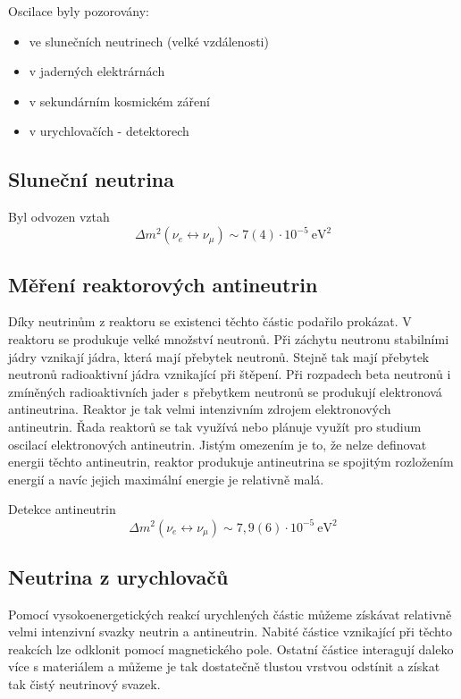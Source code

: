 \documentclass[../../main.tex]{subfiles}
\begin{document}
Oscilace byly pozorovány:
\begin{itemize}
	\item ve slunečních neutrinech (velké vzdálenosti)
	\item v jaderných elektrárnách
	\item v sekundárním kosmickém záření
	\item v urychlovačích - detektorech
\end{itemize}	
	
\subsection{Sluneční neutrina}

Byl odvozen vztah 
\begin{equation}
\Delta m^2 (\nu_e \leftrightarrow \nu_{\mu}) \sim 7(4) \cdotp 10^{-5} ~\mathrm{eV^2}
\end{equation}

\subsection{Měření reaktorových antineutrin}

Díky neutrinům z reaktoru se existenci těchto částic podařilo prokázat. V reaktoru se produkuje velké množství neutronů. Při záchytu neutronu stabilními jádry vznikají jádra, která mají přebytek neutronů. Stejně tak mají přebytek neutronů radioaktivní jádra vznikající při štěpení. Při rozpadech beta neutronů i zmíněných radioaktivních jader s přebytkem neutronů se produkují elektronová antineutrina. Reaktor je tak velmi intenzivním zdrojem elektronových antineutrin. Řada reaktorů se tak využívá nebo plánuje využít pro studium oscilací elektronových antineutrin. Jistým omezením je to, že nelze definovat energii těchto antineutrin, reaktor produkuje antineutrina se spojitým rozložením energií a navíc jejich maximální energie je relativně malá.

Detekce antineutrin 
\begin{equation}
\Delta m^2 (\nu_e \leftrightarrow \nu_{\mu}) \sim 7,9(6) \cdotp 10^{-5} ~\mathrm{eV^2}
\end{equation}

\subsection{Neutrina z urychlovačů}

Pomocí vysokoenergetických reakcí urychlených částic můžeme získávat relativně velmi intenzivní svazky neutrin a antineutrin. Nabité částice vznikající při těchto reakcích lze odklonit pomocí magnetického pole. Ostatní částice interagují daleko více s materiálem a můžeme je tak dostatečně tlustou vrstvou odstínit a získat tak čistý neutrinový svazek.
\end{document}

